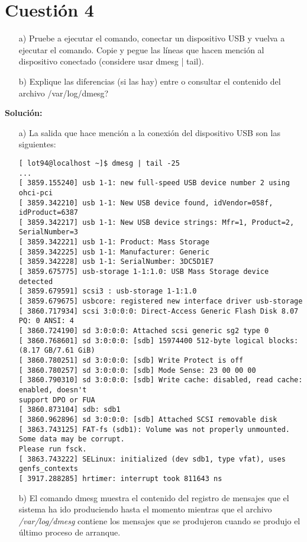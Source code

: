 \documentclass[a4paper, 10pt]{article} %
\begin{document}
\section{Cuestión 4}
\begin{itemize}
\item[a)] Pruebe a ejecutar el comando, conectar un dispositivo USB y vuelva a ejecutar el comando. Copie y pegue las líneas que hacen mención al dispositivo conectado (considere usar dmesg | tail).
\item[b)] Explique las diferencias (si las hay) entre o consultar el contenido del archivo /var/log/dmesg?
\end{itemize}
\textbf{Solución:}\\
\begin{itemize}
\item[a)] La salida que hace mención a la conexión del dispositivo USB son las siguientes:
\begin{verbatim}
[ lot94@localhost ~]$ dmesg | tail -25
...
[ 3859.155240] usb 1-1: new full-speed USB device number 2 using ohci-pci
[ 3859.342210] usb 1-1: New USB device found, idVendor=058f, idProduct=6387 
[ 3859.342217] usb 1-1: New USB device strings: Mfr=1, Product=2, SerialNumber=3 
[ 3859.342221] usb 1-1: Product: Mass Storage 
[ 3859.342225] usb 1-1: Manufacturer: Generic 
[ 3859.342228] usb 1-1: SerialNumber: 3DC5D1E7 
[ 3859.675775] usb-storage 1-1:1.0: USB Mass Storage device detected 
[ 3859.679591] scsi3 : usb-storage 1-1:1.0 
[ 3859.679675] usbcore: registered new interface driver usb-storage 
[ 3860.717934] scsi 3:0:0:0: Direct-Access Generic Flash Disk 8.07 PQ: 0 ANSI: 4 
[ 3860.724190] sd 3:0:0:0: Attached scsi generic sg2 type 0 
[ 3860.768601] sd 3:0:0:0: [sdb] 15974400 512-byte logical blocks: (8.17 GB/7.61 GiB) 
[ 3860.780251] sd 3:0:0:0: [sdb] Write Protect is off 
[ 3860.780257] sd 3:0:0:0: [sdb] Mode Sense: 23 00 00 00 
[ 3860.790310] sd 3:0:0:0: [sdb] Write cache: disabled, read cache: enabled, doesn't 
support DPO or FUA 
[ 3860.873104] sdb: sdb1 
[ 3860.962896] sd 3:0:0:0: [sdb] Attached SCSI removable disk 
[ 3863.743125] FAT-fs (sdb1): Volume was not properly unmounted. Some data may be corrupt. 
Please run fsck. 
[ 3863.743222] SELinux: initialized (dev sdb1, type vfat), uses genfs_contexts 
[ 3917.288285] hrtimer: interrupt took 811643 ns
\end{verbatim}
\item[b)] \cite{2} El comando dmesg muestra el contenido del registro de mensajes que el sistema ha ido produciendo hasta el momento mientras que el archivo \textit{/var/log/dmesg} contiene los mensajes que se produjeron cuando se produjo el último proceso de arranque.
\end{itemize}
\end{document}
